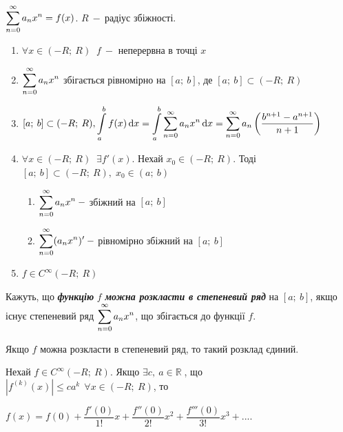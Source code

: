 \begin{theorem} $\displaystyle\sum\limits_{n=0}^\infty a_nx^n = f(x)$. $R \: - \: $радіус збіжності.
       \begin{enumerate}
       \item $\forall x \in (-R; \: R) \;\;f \: - $ неперервна в точці $x$
       \item  $\displaystyle\sum\limits_{n=0}^\infty a_nx^n$ збігається рівномірно на $[a; \: b]$, де $[a; \: b] \subset (-R; \: R)$
       \item $[a; \: b] \subset (-R; \:R), \displaystyle\int\limits_a^b f(x) \, \mathrm{d}x =  \displaystyle\int\limits_a^b \displaystyle\sum\limits_{n=0}^{\infty} a_nx^n \, \mathrm{d}x = \displaystyle\sum\limits_{n=0}^{\infty} a_n \left ( \dfrac{b^{n+1}-a^{n+1}}{n+1} \right )$ 
           \item $\forall x \in (-R; \: R) \;\; \exists f'(x)$. Нехай $x_0 \in (-R; \: R)$. Тоді $[a; \: b] \subset (-R; \:R),\; x_0\in (a; \: b) $
            \begin{enumerate}
            \item  $\displaystyle\sum\limits_{n=0}^\infty a_nx^n \: -$ збіжний на $[a; \: b]$
          \item  $\displaystyle\sum\limits_{n=0}^\infty (a_nx^n)' \: -$ рівномірно збіжний на $[a; \: b]$
            \end{enumerate}
           \item  $f \in C^{\infty}(-R; \: R)$
       \end{enumerate}
\end{theorem}



\begin{definition}
    Кажуть, що  \textcolor{NavyBlue}{\textbf{\textit{функцію}}} $f $ \textcolor{NavyBlue}{\textbf{\textit{ можна розкласти в степеневий ряд}}} на $[a; \: b]$, якщо існує \newline степеневий ряд $\displaystyle\sum\limits_{n=0}^\infty a_nx^n$, що збігається до функції $f$.
\end{definition}

\begin{theorem}[]
Якщо $f $ можна розкласти в степеневий ряд, то такий розклад єдиний. 

\end{theorem}


\begin{theorem}
Нехай $f \in C^{\infty}(-R; \: R)$. Якщо $\exists c, \: a \in \mathbb{R}  \; $, що $\left| f^{(k)}(x)\right| \leqslant  c  a^k \ \ \forall x \in (-R; \: R)$, то \newline \centerline{$f(x) = f(0) + \dfrac{f'(0)}{1!}  x + \dfrac{f''(0)}{2!}  x^2 + \dfrac{f'''(0)}{3!}  x^3 + ...$.}

\end{theorem}

